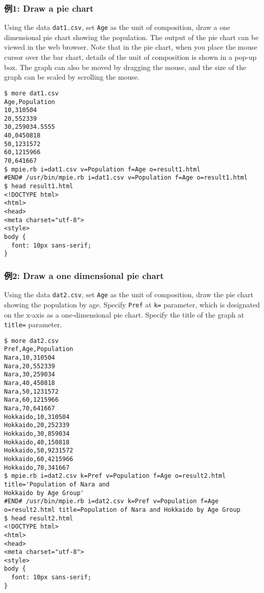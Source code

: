 \subsubsection*{例1: Draw a pie chart}

Using the data \verb|dat1.csv|, set \verb|Age| as the unit of composition, draw a one dimensional pie chart  showing the population.
The output of the pie chart can be viewed in the web browser. Note that in the pie chart, when you place the mouse cursor over the bar chart, details of the unit of composition is shown in a pop-up box. The graph can also be moved by dragging the mouse, and the size of the graph can be scaled by scrolling the mouse.


\begin{Verbatim}[baselinestretch=0.7,frame=single]
$ more dat1.csv
Age,Population
10,310504
20,552339
30,259034.5555
40,0450818
50,1231572
60,1215966
70,641667
$ mpie.rb i=dat1.csv v=Population f=Age o=result1.html
#END# /usr/bin/mpie.rb i=dat1.csv v=Population f=Age o=result1.html
$ head result1.html
<!DOCTYPE html>
<html>
<head>
<meta charset="utf-8">
<style>
body {
  font: 10px sans-serif;
}
\end{Verbatim}

\begin{flushleft}
\end{flushleft}

\subsubsection*{例2: Draw a one dimensional pie chart}

Using the data \verb|dat2.csv|, set \verb|Age| as the unit of composition, draw the pie chart showing the population by age. Specify \verb|Pref| at \verb|k=| parameter, which is designated on the x-axis as a one-dimensional pie chart. Specify the title of the graph at \verb|title=| parameter.


\begin{Verbatim}[baselinestretch=0.7,frame=single]
$ more dat2.csv
Pref,Age,Population
Nara,10,310504
Nara,20,552339
Nara,30,259034
Nara,40,450818
Nara,50,1231572
Nara,60,1215966
Nara,70,641667
Hokkaido,10,310504
Hokkaido,20,252339
Hokkaido,30,859034
Hokkaido,40,150818
Hokkaido,50,9231572
Hokkaido,60,4215966
Hokkaido,70,341667
$ mpie.rb i=dat2.csv k=Pref v=Population f=Age o=result2.html title='Population of Nara and 
Hokkaido by Age Group'
#END# /usr/bin/mpie.rb i=dat2.csv k=Pref v=Population f=Age o=result2.html title=Population of Nara and Hokkaido by Age Group
$ head result2.html
<!DOCTYPE html>
<html>
<head>
<meta charset="utf-8">
<style>
body {
  font: 10px sans-serif;
}
\end{Verbatim}

